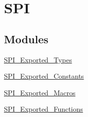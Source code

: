 \hypertarget{group__SPI}{
\section{SPI}
\label{group__SPI}
}
\subsection*{Modules}
\begin{DoxyCompactItemize}
\item 
\hyperlink{group__SPI__Exported__Types}{SPI\_\-Exported\_\-Types}
\item 
\hyperlink{group__SPI__Exported__Constants}{SPI\_\-Exported\_\-Constants}
\item 
\hyperlink{group__SPI__Exported__Macros}{SPI\_\-Exported\_\-Macros}
\item 
\hyperlink{group__SPI__Exported__Functions}{SPI\_\-Exported\_\-Functions}
\end{DoxyCompactItemize}
